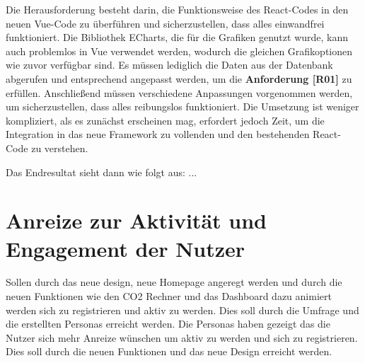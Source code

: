 Die Herausforderung besteht darin, die Funktionsweise des React-Codes in den neuen Vue-Code zu überführen und sicherzustellen, dass alles einwandfrei funktioniert. Die Bibliothek ECharts, die für die Grafiken genutzt wurde, kann auch problemlos in Vue verwendet werden, wodurch die gleichen Grafikoptionen wie zuvor verfügbar sind. Es müssen lediglich die Daten aus der Datenbank abgerufen und entsprechend angepasst werden, um die \textbf{Anforderung [R01]} zu erfüllen. Anschließend müssen verschiedene Anpassungen vorgenommen werden, um sicherzustellen, dass alles reibungslos funktioniert. Die Umsetzung ist weniger kompliziert, als es zunächst erscheinen mag, erfordert jedoch Zeit, um die Integration in das neue Framework zu vollenden und den bestehenden React-Code zu verstehen.

Das Endresultat sieht dann wie folgt aus: ...

\section{Anreize zur Aktivität und Engagement der Nutzer}


Sollen durch das neue design, neue Homepage angeregt werden und durch die neuen Funktionen wie den CO2 Rechner und das Dashboard dazu animiert werden sich zu registrieren und aktiv zu werden. Dies soll durch die Umfrage und die erstellten Personas erreicht werden. Die Personas haben gezeigt das die Nutzer sich mehr Anreize wünschen um aktiv zu werden und sich zu registrieren. Dies soll durch die neuen Funktionen und das neue Design erreicht werden.
